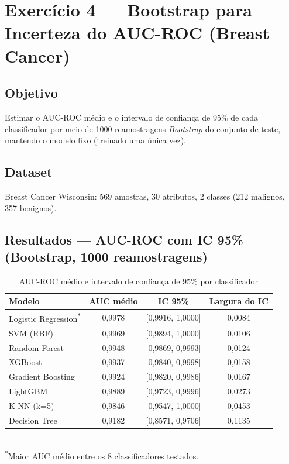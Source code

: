 \documentclass[12pt,a4paper]{article}
\begin{document}
\newpage
\section{Exercício 4 --- Bootstrap para Incerteza do AUC-ROC (Breast Cancer)}

\subsection{Objetivo}
Estimar o AUC-ROC médio e o intervalo de confiança de 95\% de cada classificador por meio de 1000 reamostragens \emph{Bootstrap} do conjunto de teste, mantendo o modelo fixo (treinado uma única vez).

\subsection{Dataset}
Breast Cancer Wisconsin: 569 amostras, 30 atributos, 2 classes (212 malignos, 357 benignos).

\subsection{Resultados --- AUC-ROC com IC 95\% (Bootstrap, 1000 reamostragens)}

\begin{table}[H]
\centering
\caption{AUC-ROC médio e intervalo de confiança de 95\% por classificador}
\begin{tabular}{lccc}
\toprule
Modelo & AUC médio & IC 95\% & Largura do IC \\
\midrule
Logistic Regression\textsuperscript{*} & 0{,}9978 & [0{,}9916, 1{,}0000] & 0{,}0084 \\
SVM (RBF)            & 0{,}9969 & [0{,}9894, 1{,}0000] & 0{,}0106 \\
Random Forest        & 0{,}9948 & [0{,}9869, 0{,}9993] & 0{,}0124 \\
XGBoost              & 0{,}9937 & [0{,}9840, 0{,}9998] & 0{,}0158 \\
Gradient Boosting    & 0{,}9924 & [0{,}9820, 0{,}9986] & 0{,}0167 \\
LightGBM             & 0{,}9889 & [0{,}9723, 0{,}9996] & 0{,}0273 \\
K-NN (k=5)           & 0{,}9846 & [0{,}9547, 1{,}0000] & 0{,}0453 \\
Decision Tree        & 0{,}9182 & [0{,}8571, 0{,}9706] & 0{,}1135 \\
\bottomrule
\end{tabular}
\\[0.2cm]
\footnotesize{\textsuperscript{*}Maior AUC médio entre os 8 classificadores testados.}
\end{table}
\end{document}

